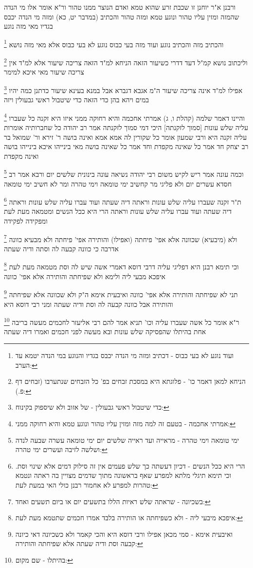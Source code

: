 \documentclass[12pt, openany]{book}
\newcommand{\footnotecomment}[1]{
	\renewcommand\thefootnote{}
	\footnote{#1}}
\newcommand{\commenta}[1]{\footnotecomment{#1}}
\begin{document}
{ורבנן א"ר יוחנן זו שכבת זרע שהוא טמא ואדם הנוצר ממנו טהור 
ור"א אומר אלו מי הנדה שהמזה ומזין עליו טהור ונוגע טמא ומזה טהור והכתיב (במדבר יט, כא) ומזה מי הנדה יכבס בגדיו מאי מזה נוגע 
\commenta{ועוד נוגע לא בעי כבוס - דכתיב ומזה מי הנדה יכבס בגדיו והנוגע במי הנדה יטמא עד הערב:}
והכתיב מזה והכתיב נוגע ועוד מזה בעי כבוס נוגע לא בעי כבוס אלא מאי מזה נושא 
\commenta{הניחא למאן דאמר כו' - פלוגתא היא במסכת זבחים בפ' כל הזבחים שנתערבו (זבחים דף פ.):}
וליכתוב נושא קמ"ל דעד דדרי כשיעור הזאה הניחא למ"ד הזאה צריכה שיעור אלא למ"ד אין צריכה שיעור מאי איכא למימר 
\commenta{כדי שיטבול ראשי גבעולין - של אזוב ולא שיספוק בקינוח:}
אפילו למ"ד אינה צריכה שיעור ה"מ אגבא דגברא אבל במנא בעינא שיעור כדתנן כמה יהיו במים ויהא בהן כדי הזאה כדי שיטבול ראשי גבעולין ויזה 
\commenta{אמרתי אחכמה - בטעם זה למה מזה ומזין עליו טהור ונוגע טמא והיא רחוקה ממני:}
והיינו דאמר שלמה (קהלת ו, ג) אמרתי אחכמה והיא רחוקה ממני
איזו היא זקנה כל שעברו עליה שלש עונות [סמוך לזקנתה] היכי דמי סמוך לזקנתה אמר רב יהודה כל שחברותיה אומרות עליה זקנה היא ורבי שמעון אומר
כל שקורין לה אמא אמא ואינה בושה ר' זירא ור' שמואל בר רב יצחק חד אמר כל שאינה מקפדת וחד אמר כל שאינה בושה  מאי בינייהו איכא בינייהו בושה ואינה מקפדת 
\commenta{ימי טומאה וימי טהרה - מראייה ועד ראייה שלשים יום ימי טומאה עשרה שבעה לנדה ושלשה לזיבה ועשרים ימי טהרה:}
וכמה עונה אמר ריש לקיש משום רבי יהודה נשיאה עונה בינונית שלשים יום ורבא אמר רב חסדא עשרים יום ולא פליגי מר קחשיב ימי טומאה וימי טהרה ומר לא חשיב ימי טומאה 
\commenta{הרי היא ככל הנשים - דכיון דעשתה כך שלש פעמים אין זה סילוק דמים אלא שינוי וסת. וכי תימא תיגלי מלתא למפרע שאף בראשונה מתוך שדמים מצויין בה ראתה ונטמא טהרות למפרע לא אחמור רבנן כולי האי במעת לעת:}
ת"ר זקנה שעברו עליה שלש עונות וראתה דיה שעתה ועוד עברו עליה שלש עונות וראתה דיה שעתה ועוד עברו עליה שלש עונות וראתה הרי היא ככל הנשים ומטמאה מעת לעת ומפקידה לפקידה 
\commenta{בשכיונה - שראתה שלש ראיות הללו בתשעים יום או ביום תשעים ואחד:}
ולא (מיבעיא) שכוונה אלא אפי' פיחתה (ואפילו) והותירה 
אפי' פיחתה ולא מבעיא כוונה אדרבה כי כוונה קבעה לה וסתה ודיה שעתה 
\commenta{איפכא מיבעי ליה - ולא כשפיחתה או הותירה בלבד אמרו חכמים שתטמא מעת לעת:}
וכי תימא רבנן היא דפליגי עליה דרבי דוסא דאמרי אשה שיש לה וסת מטמאה מעת לעת איפכא מבעי ליה ולימא ולא שפיחתה והותירה אלא אפי' כוונה 
\commenta{ואיבעית אימא - סמי מכאן אפילו ורבי דוסא היא והכי קאמר ולא כשכיונה דאי כיונה קבעה וסת ודיה שעתה אלא שפיחתה והותירה:}
תני לא שפיחתה והותירה אלא אפי' כוונה ואיבעית אימא ה"ק ולא שכוונה אלא שפיחתה והותירה אבל כוונה קבעה לה וסת ודיה שעתה ומני רבי דוסא היא
\commenta{בהיתלו - שם מקום:}
ר"א אומר כל אשה שעברו עליה וכו' תניא אמר להם רבי אליעזר לחכמים מעשה בריבה אחת בהיתלו שהפסיקה שלש עונות ובא מעשה לפני חכמים ואמרו דיה שעתה 
}
\end{document}
